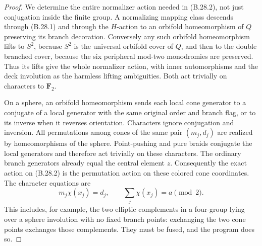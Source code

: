 \begin{proof}
We determine the entire normalizer action needed in (B.28.2), not
just conjugation inside the finite group.  A normalizing mapping
class descends through (B.28.1) and through the $H$-action to an
orbifold homeomorphism of $Q$ preserving its branch decoration.
Conversely any such orbifold homeomorphism lifts to $S^2$, because
$S^2$ is the universal orbifold cover of $Q$, and then to the double
branched cover, because the six peripheral mod-two monodromies are
preserved.  Thus its lifts give the whole normalizer action, with
inner automorphisms and the deck involution as the harmless lifting
ambiguities.  Both act trivially on characters to $\mathbf F_2$.

On a sphere, an orbifold homeomorphism sends each local cone
generator to a conjugate of a local generator with the same original
order and branch flag, or to its inverse when it reverses
orientation.  Characters ignore conjugation and inversion.  All
permutations among cones of the same pair $(m_j,d_j)$ are realized
by homeomorphisms of the sphere.  Point-pushing and pure braids
conjugate the local generators and therefore act trivially on these
characters.  The ordinary branch generators already equal the
central element $z$.  Consequently the exact action on (B.28.2)
is the permutation action on these colored cone coordinates.
The character equations are
\[
       m_j\chi(x_j)=d_j,\qquad
       \sum_j\chi(x_j)=a\pmod2.                       \tag{B.28.6}
\]
This includes, for example, the two elliptic complements in a
four-group lying over a sphere involution with no fixed branch
points: exchanging the two cone points exchanges those complements.
They must be fused, and the program does so.


\end{proof}
